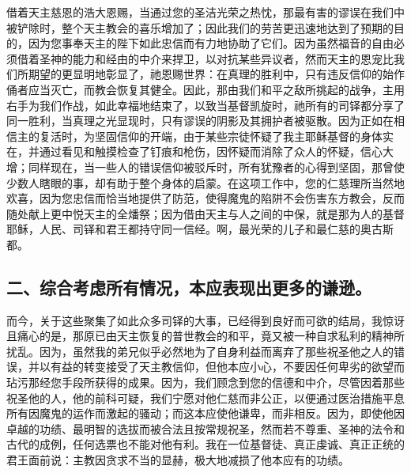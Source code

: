 \par

借着天主慈恩的浩大恩赐，当通过您的圣洁光荣之热忱，那最有害的谬误在我们中被铲除时，整个天主教会的喜乐增加了；因此我们的劳苦更迅速地达到了预期的目的，因为您事奉天主的陛下如此忠信而有力地协助了它们。因为虽然福音的自由必须借着圣神的能力和经由的中介来捍卫，以对抗某些异议者，然而天主的恩宠比我们所期望的更显明地彰显了，祂恩赐世界：在真理的胜利中，只有违反信仰的始作俑者应当灭亡，而教会恢复其健全。因此，那由我们和平之敌所挑起的战争，主用右手为我们作战，如此幸福地结束了，以致当基督凯旋时，祂所有的司铎都分享了同一胜利，当真理之光显现时，只有谬误的阴影及其拥护者被驱散。因为正如在相信主的复活时，为坚固信仰的开端，由于某些宗徒怀疑了我主耶稣基督的身体实在，并通过看见和触摸检查了钉痕和枪伤，因怀疑而消除了众人的怀疑，信心大增；同样现在，当一些人的错误信仰被驳斥时，所有犹豫者的心得到坚固，那曾使少数人瞎眼的事，却有助于整个身体的启蒙。在这项工作中，您的仁慈理所当然地欢喜，因为您忠信而恰当地提供了防范，使得魔鬼的陷阱不会伤害东方教会，反而随处献上更中悦天主的全燔祭；因为借由天主与人之间的中保，就是那为人的基督耶稣，人民、司铎和君王都持守同一信经。啊，最光荣的儿子和最仁慈的奥古斯都。\par


\subsection{二、综合考虑所有情况，本应表现出更多的谦逊。}

而今，关于这些聚集了如此众多司铎的大事，已经得到良好而可欲的结局，我惊讶且痛心的是，那原已由天主恢复的普世教会的和平，竟又被一种自求私利的精神所扰乱。因为，虽然我的弟兄似乎必然地为了自身利益而离弃了那些祝圣他之人的错误，并以有益的转变接受了天主教信仰，但他本应小心，不要因任何卑劣的欲望而玷污那经您手段所获得的成果。因为，我们顾念到您的信德和中介，尽管因着那些祝圣他的人，他的前科可疑，我们宁愿对他仁慈而非公正，以便通过医治措施平息所有因魔鬼的运作而激起的骚动；而这本应使他谦卑，而非相反。因为，即使他因卓越的功绩、最明智的选拔而被合法且按常规祝圣，然而若不尊重、圣神的法令和古代的成例，任何选票也不能对他有利。我在一位基督徒、真正虔诚、真正正统的君王面前说：主教因贪求不当的显赫，极大地减损了他本应有的功绩。\par

